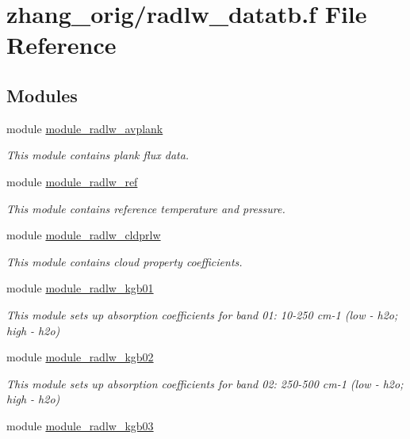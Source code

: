 \hypertarget{zhang__orig_2radlw__datatb_8f}{}\section{zhang\+\_\+orig/radlw\+\_\+datatb.f File Reference}
\label{zhang__orig_2radlw__datatb_8f}
\subsection*{Modules}
\begin{DoxyCompactItemize}
\item 
module \hyperlink{namespacemodule__radlw__avplank}{module\+\_\+radlw\+\_\+avplank}
\begin{DoxyCompactList}\small\item\em This module contains plank flux data. \end{DoxyCompactList}\item 
module \hyperlink{namespacemodule__radlw__ref}{module\+\_\+radlw\+\_\+ref}
\begin{DoxyCompactList}\small\item\em This module contains reference temperature and pressure. \end{DoxyCompactList}\item 
module \hyperlink{namespacemodule__radlw__cldprlw}{module\+\_\+radlw\+\_\+cldprlw}
\begin{DoxyCompactList}\small\item\em This module contains cloud property coefficients. \end{DoxyCompactList}\item 
module \hyperlink{namespacemodule__radlw__kgb01}{module\+\_\+radlw\+\_\+kgb01}
\begin{DoxyCompactList}\small\item\em This module sets up absorption coefficients for band 01\+: 10-\/250 cm-\/1 (low -\/ h2o; high -\/ h2o) \end{DoxyCompactList}\item 
module \hyperlink{namespacemodule__radlw__kgb02}{module\+\_\+radlw\+\_\+kgb02}
\begin{DoxyCompactList}\small\item\em This module sets up absorption coefficients for band 02\+: 250-\/500 cm-\/1 (low -\/ h2o; high -\/ h2o) \end{DoxyCompactList}\item 
module \hyperlink{namespacemodule__radlw__kgb03}{module\+\_\+radlw\+\_\+kgb03}

\end{DoxyCompactItemize}
